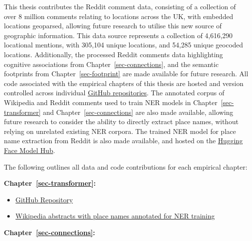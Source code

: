 \documentclass[
  letterpaper,
  11pt,
  english,
  onehalfspacing,
  headsepline]{MastersDoctoralThesis}
\providecommand{\tightlist}{%
  \setlength{\itemsep}{0pt}\setlength{\parskip}{0pt}}\usepackage{longtable,booktabs,array}
\begin{document}
This thesis contributes the Reddit comment data, consisting of a
collection of over 8 million comments relating to locations across the
UK, with embedded locations geoparsed, allowing future research to
utilise this new source of geographic information. This data source
represents a collection of 4,616,290 locational mentions, with 305,104
unique locations, and 54,285 unique geocoded locations. Additionally,
the processed Reddit comments data highlighting cognitive associations
from Chapter~\ref{sec-connections}, and the semantic footprints from
Chapter~\ref{sec-footprint} are made available for future research. All
code associated with the empirical chapters of this thesis are hosted
and version controlled across individual
\href{https://github.com/cjber}{GitHub repositories}. The annotated
corpus of Wikipedia and Reddit comments used to train NER models in
Chapter~\ref{sec-transformer} and Chapter~\ref{sec-connections} are also
made available, allowing future research to consider the ability to
directly extract place names, without relying on unrelated existing NER
corpora. The trained NER model for place name extraction from Reddit is
also made available, and hosted on the
\href{https://huggingface.co/cjber/reddit-ner-place_names}{Hugging Face
Model Hub}.

The following outlines all data and code contributions for each
empirical chapter:

\textbf{Chapter~\ref{sec-transformer}:}

\begin{itemize}
\tightlist
\item
  \href{https://github.com/cjber/ger-wiki}{GitHub Repository}
\item
  \href{https://github.com/cjber/ger-wiki/tree/main/data_processing/data/processed}{Wikipedia
  abstracts with place names annotated for NER training}
\end{itemize}

\textbf{Chapter~\ref{sec-connections}:}
\end{document}
